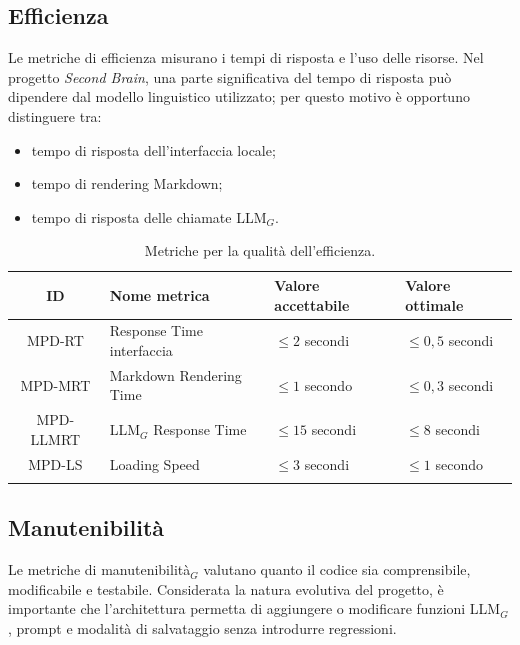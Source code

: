 \documentclass[a4paper, 10pt, colorlinks=true, linkcolor=black, urlcolor=blue, citecolor=blue, hidelinks]{article}
\begin{document}
\subsection{Efficienza}

Le metriche di efficienza misurano i tempi di risposta e l'uso delle risorse. Nel progetto \textit{Second Brain}, una parte significativa del tempo di risposta può dipendere dal modello linguistico utilizzato; per questo motivo è opportuno distinguere tra:
\begin{itemize}
    \item tempo di risposta dell'interfaccia locale;
    \item tempo di rendering Markdown;
    \item tempo di risposta delle chiamate LLM$_G$.
\end{itemize}

\begingroup
\small
\renewcommand{\arraystretch}{1.25}
\begin{longtable}{|c|p{4cm}|p{3cm}|p{3cm}|}
    \hline
    \textbf{ID} & \textbf{Nome metrica} & \textbf{Valore accettabile} & \textbf{Valore ottimale} \\
    \hline
    \endhead

    MPD-RT & Response Time interfaccia & $\leq 2$ secondi & $\leq 0{,}5$ secondi \\ \hline
    MPD-MRT & Markdown Rendering Time & $\leq 1$ secondo & $\leq 0{,}3$ secondi \\ \hline
    MPD-LLMRT & LLM$_G$ Response Time & $\leq 15$ secondi & $\leq 8$ secondi \\ \hline
    MPD-LS & Loading Speed & $\leq 3$ secondi & $\leq 1$ secondo \\ \hline

    \caption{Metriche per la qualità dell'efficienza.}
    \label{tab:metriche-efficienza}
\end{longtable}
\endgroup

\subsection{Manutenibilità}

Le metriche di manutenibilità$_G$ valutano quanto il codice sia comprensibile, modificabile e testabile. Considerata la natura evolutiva del progetto, è importante che l'architettura permetta di aggiungere o modificare funzioni LLM$_G$, prompt e modalità di salvataggio senza introdurre regressioni.
\end{document}
